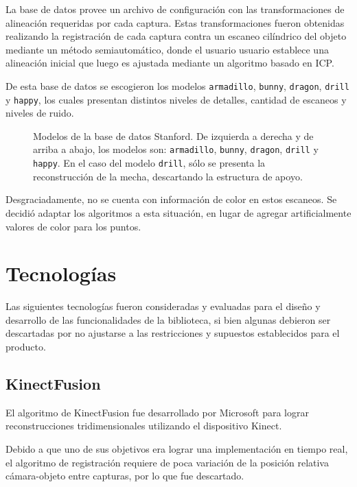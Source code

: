 La base de datos provee un archivo de configuración con las transformaciones de
alineación requeridas por cada captura.
Estas transformaciones fueron obtenidas realizando la registración de cada captura
contra un escaneo cilíndrico del objeto mediante un método semiautomático, donde el usuario
usuario establece una alineación inicial que luego es ajustada mediante un algoritmo
basado en ICP\cite{Turk:1994:ZPM:192161.192241}.

De esta base de datos se escogieron los modelos
	\texttt{armadillo},
	\texttt{bunny},
	\texttt{dragon},
	\texttt{drill} y
	\texttt{happy},
los cuales presentan distintos niveles de detalles, cantidad de escaneos y niveles de ruido.


\begin{figure}
	\caption[Modelos de la base de datos Stanford]{\label{fig:stanford_models}Modelos de la base de datos Stanford.
		De izquierda a derecha y de arriba a abajo, los modelos son:
		\texttt{armadillo},
		\texttt{bunny},
		\texttt{dragon},
		\texttt{drill}
		y \texttt{happy}.
		En el caso del modelo \texttt{drill}, sólo se presenta la reconstrucción de la mecha, descartando la estructura de apoyo.}
\end{figure}


Desgraciadamente, no se cuenta con información de color en estos escaneos.
Se decidió adaptar los algoritmos a esta situación, en lugar de agregar
artificialmente valores de color para los puntos.


\section{Tecnologías}
Las siguientes tecnologías fueron consideradas y evaluadas
para el diseño y desarrollo de las funcionalidades de la biblioteca,
si bien algunas debieron ser descartadas por no ajustarse a las restricciones
y supuestos establecidos para el producto.

	\subsection{KinectFusion}
	El algoritmo de KinectFusion fue desarrollado por Microsoft
	para lograr reconstrucciones tridimensionales utilizando el dispositivo Kinect.

	Debido a que uno de sus objetivos era lograr una implementación en tiempo
	real, el algoritmo de registración requiere de poca variación
	de la posición relativa cámara-objeto entre capturas, por lo que fue descartado.

